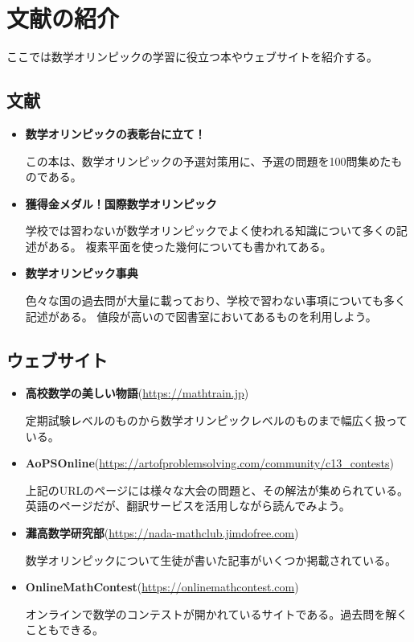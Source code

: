 \documentclass[uplatex,dvipdfmx]{jsbook}
\begin{document}
\chapter{文献の紹介}

ここでは数学オリンピックの学習に役立つ本やウェブサイトを紹介する。

\section{文献}

\begin{itemize}
    \item \textbf{数学オリンピックの表彰台に立て！}

    この本は、数学オリンピックの予選対策用に、予選の問題を100問集めたものである。

    \item \textbf{獲得金メダル！国際数学オリンピック}

    学校では習わないが数学オリンピックでよく使われる知識について多くの記述がある。
    複素平面を使った幾何についても書かれてある。

    \item \textbf{数学オリンピック事典}

    色々な国の過去問が大量に載っており、学校で習わない事項についても多く記述がある。
    値段が高いので図書室においてあるものを利用しよう。
\end{itemize}

\section{ウェブサイト}

\begin{itemize}
    \item \textbf{高校数学の美しい物語}(\url{https://mathtrain.jp})

    定期試験レベルのものから数学オリンピックレベルのものまで幅広く扱っている。

    \item \textbf{AoPSOnline}(\url{https://artofproblemsolving.com/community/c13_contests})

    上記のURLのページには様々な大会の問題と、その解法が集められている。英語のページだが、翻訳サービスを活用しながら読んでみよう。

    \item \textbf{灘高数学研究部}(\url{https://nada-mathclub.jimdofree.com})

    数学オリンピックについて生徒が書いた記事がいくつか掲載されている。

    \item \textbf{OnlineMathContest}(\url{https://onlinemathcontest.com})

    オンラインで数学のコンテストが開かれているサイトである。過去問を解くこともできる。
\end{itemize}
\end{document}
